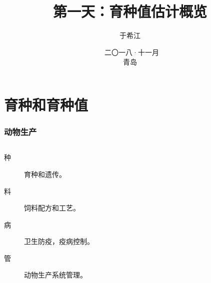 \documentclass[serif,aspectratio=169]{beamer}
\begin{document}
\title{第一天：育种值估计概览}
\author{于希江}
\date{\tiny{~{二〇一八·十一月} \\青岛}}

\frame{
  \titlepage
}


\section{育种和育种值}
\begin{frame}
  \frametitle{动物生产}
  \begin{columns}
    \begin{column}{.5\textwidth}
      \begin{description}
      \item [种] 育种和遗传。
      \item [料] 饲料配方和工艺。
      \item [病] 卫生防疫，疫病控制。
      \item [管] 动物生产系统管理。
      \end{description}
    \end{column}


\end{columns}
\end{frame}
\end{document}
